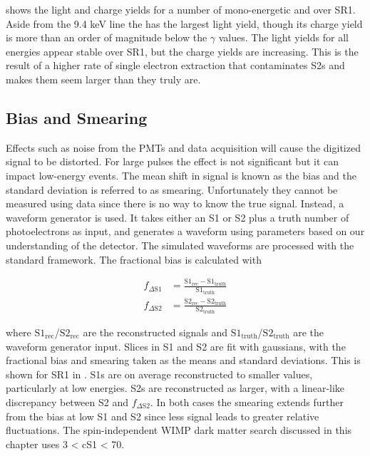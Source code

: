  shows the light and charge yields for a number of mono-energetic \gammarays and  over
SR1.  Aside from the 9.4 keV \metakr line the  \alphadecay has the largest light yield, though its charge yield is more than
an order of magnitude below the $\gamma$ values.  The light yields for all energies appear stable over SR1, but the charge yields are
increasing.  This is the result of a higher rate of single electron extraction that contaminates S2s and makes them seem larger than they
truly are.



\subsection{Bias and Smearing}
\label{subsec:det_char_bias_smearing}
Effects such as noise from the PMTs and data acquisition will cause the digitized signal to be distorted.  For large pulses the
effect is not significant but it can impact low-energy events.  The mean shift in signal is known as the bias and the standard deviation
is referred
to as smearing.  Unfortunately they cannot be measured using data since there is no way to know the true signal.  Instead, a waveform
generator is used.  It takes either an S1 or S2 plus a truth number of photoelectrons as input, and generates a waveform using parameters
based on our understanding of the detector.  The simulated waveforms are
processed with the standard framework.  The fractional bias is calculated with

\begin{subequations}
\begin{align}
f_{\Delta \mathrm{S1}} &= \frac{\mathrm{S1_{rec} - S1_{truth}}}{\mathrm{S1_{truth}}} \\[3pt]
f_{\Delta \mathrm{S2}} &= \frac{\mathrm{S2_{rec} - S2_{truth}}}{\mathrm{S2_{truth}}}
\end{align}
\end{subequations}

\noindent where $\mathrm{S1_{rec}}$/$\mathrm{S2_{rec}}$ are the reconstructed signals and $\mathrm{S1_{truth}}$/$\mathrm{S2_{truth}}$ are
the waveform generator input.  Slices in S1 and S2 are fit with gaussians, with the fractional bias and smearing taken as the means and
standard deviations.  This is shown for SR1 in .  S1s are on average reconstructed to smaller
values, particularly at low energies.  S2s are reconstructed as larger, with a linear-like discrepancy between S2 and
$f_{\Delta \mathrm{S2}}$.  In both cases the smearing extends further from the bias at low S1 and S2 since less signal leads to greater
relative fluctuations.  The spin-independent WIMP dark matter search discussed in this chapter uses 3 < cS1 < 70.

